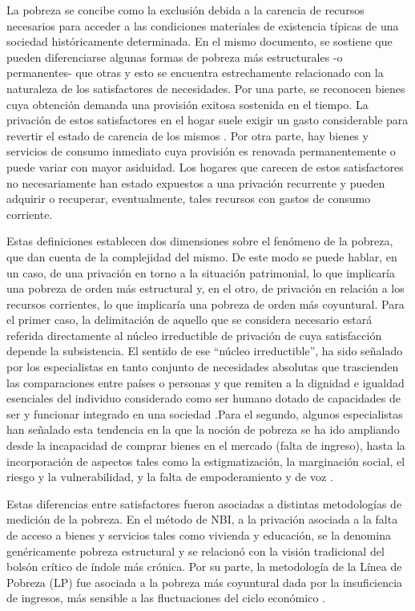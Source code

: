 La pobreza se concibe \citeyear{indec2003c} como la exclusión debida a la carencia de recursos necesarios para acceder a las condiciones materiales de existencia típicas de una sociedad históricamente determinada. En el mismo documento, se sostiene que pueden diferenciarse algunas formas de pobreza más estructurales -o permanentes- que otras y esto se encuentra estrechamente relacionado con la naturaleza de los satisfactores de necesidades. Por una parte, se reconocen bienes cuya obtención demanda una provisión exitosa sostenida en el tiempo. La privación de estos satisfactores en el hogar suele exigir un gasto considerable para revertir el estado de carencia de los mismos \cite{katzman,boltvinik1990}. Por otra parte, hay bienes y servicios de consumo inmediato cuya provisión es renovada permanentemente o puede variar con mayor asiduidad. Los hogares que carecen de estos satisfactores no necesariamente han estado expuestos a una privación recurrente y pueden adquirir o recuperar, eventualmente, tales recursos con gastos de consumo corriente.

Estas definiciones establecen dos dimensiones sobre el fenómeno de la pobreza, que dan cuenta de la complejidad del mismo. De este modo se puede hablar, en un caso, de una privación en torno a la situación patrimonial, lo que implicaría una pobreza de orden más estructural y, en el otro, de privación en relación a los recursos corrientes, lo que implicaría una pobreza de orden más coyuntural. Para el primer caso, la delimitación de aquello que se considera necesario estará referida directamente al núcleo irreductible de privación de cuya satisfacción depende la subsistencia. El sentido de ese “núcleo irreductible”, ha sido señalado por los especialistas en tanto conjunto de necesidades absolutas que trascienden las comparaciones entre países o personas y que remiten a la dignidad e igualdad esenciales del individuo considerado como ser humano dotado de capacidades de ser y funcionar integrado en una sociedad \cite{altimir1979,sen}.Para el segundo, algunos especialistas han señalado esta tendencia en la que la noción de pobreza se ha ido ampliando desde la incapacidad de comprar bienes en el mercado (falta de ingreso), hasta la incorporación de aspectos tales como la estigmatización, la marginación social, el riesgo y la vulnerabilidad, y la falta de empoderamiento y de voz \cite{kanbur}.

Estas diferencias entre satisfactores fueron asociadas a distintas metodologías de medición de la pobreza. En el método de NBI, a la privación asociada a la falta de acceso a bienes y servicios tales como vivienda y educación, se la denomina genéricamente pobreza estructural y se relacionó con la visión tradicional del bolsón crítico de índole más crónica. Por su parte, la metodología de la Línea de Pobreza (LP) fue asociada a la pobreza más coyuntural dada por la insuficiencia de ingresos, más sensible a las fluctuaciones del ciclo económico \cite{katzman,boltvinik1990,indec1984}. 


